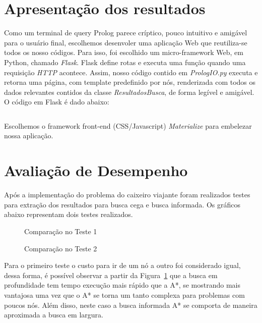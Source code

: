 \documentclass[12pt,a4paper]{article}
\begin{document}
  \section{Apresentação dos resultados}
  Como um terminal de query Prolog parece críptico, pouco intuitivo e amigável para o usuário final, escolhemos desenvoler uma aplicação Web que reutiliza-se todos os nosso códigos. Para isso, foi escolhido um micro-framework Web, em Python, chamado \emph{Flask}. Flask define rotas e executa uma função quando uma requisição \emph{HTTP} acontece. Assim, nosso código contido em \emph{PrologIO.py} executa e retorna uma página, com template predefinido por nós, renderizada com todos os dados relevantes contidos da classe \emph{ResultadosBusca}, de forma legível e amigável. O código em Flask é dado abaixo:
  \begin{mdframed}[linecolor=black, topline=true, bottomline=true,leftline=false, rightline=false, backgroundcolor=yellow!10!white]
\inputminted[tabsize=2,linenos=true,fontsize=\footnotesize,breaklines=true,breakafter=format]{python}{../tspserver.py}
\end{mdframed}

Escolhemos o framework front-end (CSS/Javascript) \emph{Materialize} para embelezar nossa aplicação.
\section{Avaliação de Desempenho}
Após a implementação do problema do caixeiro viajante foram realizados testes para extração dos resultados para busca cega e busca informada. Os gráficos abaixo representam dois testes realizados.
\begin{figure}[ht]
  \centering
  
  \caption{Comparação no Teste 1}
  \label{fig:2}
\end{figure}

\begin{figure}[ht]
  \centering
  
  \caption{Comparação no Teste 2}
  \label{fig:3}
\end{figure}

Para o primeiro teste o custo para ir de um nó a outro foi considerado igual, dessa forma, é possível observar a partir da Figura~\ref{fig:2} que a busca em profundidade tem tempo execução mais rápido que a A*, se mostrando mais vantajosa uma vez que o A* se torna um tanto complexa para problemas com poucos nós. Além disso, neste caso a busca informada A* se comporta de maneira aproximada a busca em largura.
\end{document}
